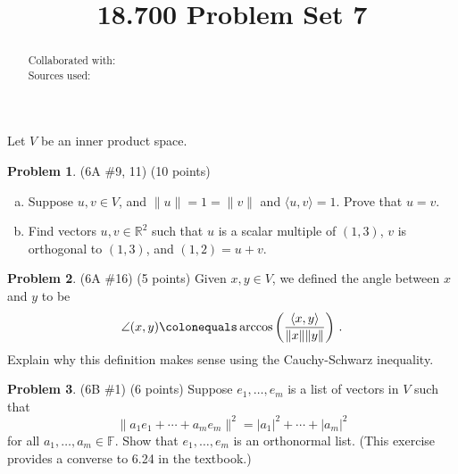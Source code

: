 \documentclass[reqno, 12pt]{amsart}
\theoremstyle{definition}
\newenvironment{problab}[1]
{\noindent\textbf{Problem #1}.}
{\vskip 6pt}
\theoremstyle{remark}
\newtheorem*{soln}{Solution}
\newcommand{\F}{\mathbb F}
\newcommand{\R}{\mathbb R}
\newcommand{\la}{\langle}
\newcommand{\ra}{\rangle}
\renewcommand{\abstractname}{}    %
\begin{document}

\title{18.700 Problem Set 7}

\maketitle

\begin{abstract}
  \noindent Collaborated with:\\
  Sources used: 
\end{abstract}
\vskip 0.5cm

Let $V$ be an inner product space.

\begin{problab}{1} (6A \#9, 11) (10 points)
  \begin{enumerate}[(a)]
    \item 
      Suppose $u,v \in V$, and $\|u\| = 1 = \|v\|$ and $\la u, v \ra = 1$. Prove that $u = v$.
    \item
      Find vectors $u,v \in \R^2$ such that $u$ is a scalar multiple of $(1,3)$, $v$ is orthogonal to $(1,3)$, and $(1,2) = u+v$.
  \end{enumerate}
\end{problab}



\begin{problab}{2} (6A \#16) (5 points)
  Given $x,y \in V$, we defined the angle between $x$ and $y$ to be
  \begin{equation*}
    \angle(x,y) \colonequals \arccos\left( \frac{\la x, y \ra}{\|x\| \|y\|} \right) \, .
  \end{equation*}
  Explain why this definition makes sense using the Cauchy-Schwarz inequality.
\end{problab}

\begin{problab}{3} (6B \#1) (6 points)
  Suppose $e_1, \ldots, e_m$ is a list of vectors in $V$ such that
  \begin{equation*}
    \|a_1 e_1 + \cdots + a_m e_m\|^2 = |a_1|^2 + \cdots + |a_m|^2
  \end{equation*}
  for all $a_1, \ldots, a_m \in \F$. Show that $e_1, \ldots, e_m$ is an orthonormal list. (This exercise provides a converse to 6.24 in the textbook.)
\end{problab}
\end{document}
